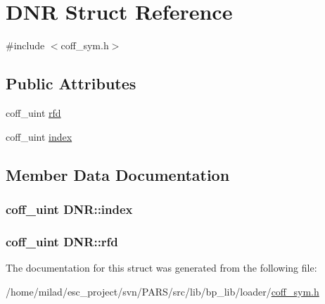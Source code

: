 \hypertarget{structDNR}{
\section{DNR Struct Reference}
\label{structDNR}
}


{\ttfamily \#include $<$coff\_\-sym.h$>$}

\subsection*{Public Attributes}
\begin{DoxyCompactItemize}
\item 
coff\_\-uint \hyperlink{structDNR_aeffcb89576f85b501a13890ca05cef37}{rfd}
\item 
coff\_\-uint \hyperlink{structDNR_a114ef57a8fe90f1981752f9c938fef46}{index}
\end{DoxyCompactItemize}


\subsection{Member Data Documentation}
\hypertarget{structDNR_a114ef57a8fe90f1981752f9c938fef46}{
\subsubsection[{index}]{\setlength{\rightskip}{0pt plus 5cm}coff\_\-uint {\bf DNR::index}}}
\label{structDNR_a114ef57a8fe90f1981752f9c938fef46}
\hypertarget{structDNR_aeffcb89576f85b501a13890ca05cef37}{
\subsubsection[{rfd}]{\setlength{\rightskip}{0pt plus 5cm}coff\_\-uint {\bf DNR::rfd}}}
\label{structDNR_aeffcb89576f85b501a13890ca05cef37}


The documentation for this struct was generated from the following file:\begin{DoxyCompactItemize}
\item 
/home/milad/esc\_\-project/svn/PARS/src/lib/bp\_\-lib/loader/\hyperlink{coff__sym_8h}{coff\_\-sym.h}\end{DoxyCompactItemize}
